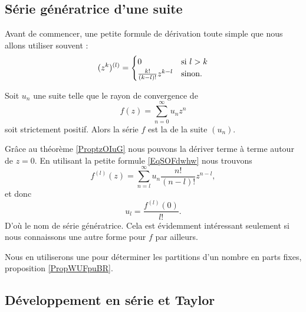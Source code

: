 \subsection{Série génératrice d'une suite}

Avant de commencer, une petite formule de dérivation toute simple que nous allons utiliser souvent :
\begin{equation}        \label{EqSOFdwhw}
    (z^k)^{(l)}=\begin{cases}
        0   &   \text{si \( l>k\)}\\
        \frac{ k! }{ (k-l)! }z^{k-l}    &    \text{sinon.}
    \end{cases}
\end{equation}

Soit \( u_n\) une suite telle que le rayon de convergence de
\begin{equation}
    f(z)=\sum_{n=0}^{\infty}u_nz^n
\end{equation}
soit strictement positif. Alors la série \( f\) est la  de la suite \( (u_n)\).

Grâce au théorème \ref{ProptzOIuG} nous pouvons la dériver terme à terme autour de \( z=0\). En utilisant la petite formule \eqref{EqSOFdwhw} nous trouvons
\begin{equation}    \label{EqNGhVCpP}
    f^{(l)}(z)=\sum_{n=l}^{\infty}u_n\frac{ n! }{ (n-l)! }z^{n-l},
\end{equation}
et donc
\begin{equation}
    u_l=\frac{ f^{(l)}(0) }{ l! }.
\end{equation}
D'où le nom de série génératrice. Cela est évidemment intéressant seulement si nous connaissons une autre forme pour \( f\) par ailleurs. 

Nous en utiliserons une pour déterminer les partitions d'un nombre en parts fixes, proposition \ref{PropWUFpuBR}.

\subsection{Développement en série et Taylor}

